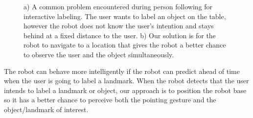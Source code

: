\documentclass{tADR2e}
\begin{document}
\begin{figure}[ht!]
\centering
    \caption{a) A common problem encountered during person following for interactive labeling. The user wants to label an object on the table, however the robot does not know the user's intention and stays behind at a fixed distance to the user. b) Our solution is for the robot to navigate to a location that gives the robot a better chance to observe the user and the object simultaneously.}
   \label{fig:landmark_labeling_example}
\end{figure}


The robot can behave more intelligently if the robot can predict ahead of time when the user is going to label a landmark. When the robot detects that the user intends to label a landmark or object, our approach is to position the robot base so it has a better chance to perceive both the pointing gesture and the object/landmark of interest. 
\end{document}
